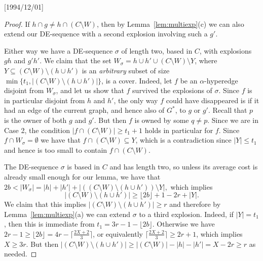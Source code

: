 \NeedsTeXFormat{LaTeX2e}[1994/12/01]\documentclass[letterpaper, 11pt]{article}
\theoremstyle{definition}
\theoremstyle{remark}
\numberwithin{equation}{section}
\begin{document}
\begin{proof}
If $h\cap g \neq h\cap (C\setminus W)$, then by
Lemma~\ref{lem:multiexp}(c) we can also extend our DE-sequence
with a second explosion involving such a $g'$.

Either way we have a DE-sequence $\sigma$ of length two,
based in $C$, with explosions $gh$ and $g'h'$. 
We claim that the set $W_{\sigma} = h \cup h' \cup 
(C\setminus W) \setminus Y$, where
$Y \subseteq (C\setminus W)\setminus (h \cup h')$ is an {\em arbitrary}
subset of size 
$\min \{t_1, |(C\setminus W)\setminus (h \cup h')| \}$,
is a cover. Indeed, let $f$ be an $\alpha$-hyperedge
disjoint from $W_{\sigma}$, and let us show that $f$ survived the
explosions of $\sigma$.  
Since $f$ is in particular disjoint from $h$ and $h'$, the only way
$f$ could have disappeared is if it had 
an edge of the current graph, and
hence also of $G^*$, to $g$ or $g'$. Recall that $p$ is the owner of
both $g$ and $g'$. But then $f$ is owned by some
$q\neq p$. Since we are in Case 2, the condition $|f\cap
(C\setminus W)| \geq t_1 +1$ holds in particular for $f$. Since $f
\cap W_{\sigma} = 
\emptyset$ we have that $f\cap (C\setminus W) \subseteq Y$, which is a
contradiction since $|Y|\leq t_1$ and hence is too small to contain
$f\cap (C\setminus W)$. 

The DE-sequence $\sigma$ is based in $C$ and has length two, so unless
its average cost is already small enough for our lemma, we have that 
$2b < |W_\sigma| = |h| + |h'|+|((C\setminus W) \setminus
(h\cup h')) \setminus Y|,$ which implies   
$$|(C\setminus W) \setminus (h\cup h')| \geq \lfloor 2b\rfloor +1 -2r + |Y|.$$
We claim that this implies $|(C\setminus W) \setminus (h\cup h')| \geq
r$ and therefore by Lemma~\ref{lem:multiexp}(a) we
can extend $\sigma$ to a third explosion. 
Indeed, if $|Y| = t_1$, then this is immediate from
$t_1=3r-1-\lfloor2b\rfloor$.  
Otherwise we have $ 2r-1 \geq \lfloor 2b \rfloor =
4r-\lceil\frac{2X+2}{3}\rceil$, or equivalently
$\lceil\frac{2X+2}{3}\rceil \geq 2r+1$, which implies $X\geq 3r$.
But then
$|(C\setminus W) \setminus (h\cup h')| \geq |(C\setminus W)|
 - |h| - |h'|= X - 2r \geq r$ as needed.
\end{proof}
\end{document}
